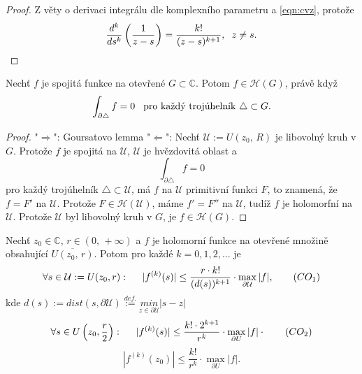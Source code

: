 \begin{proof}
Z věty o derivaci integrálu dle komplexního parametru a \cref{eqn:cvz}, protože 
\[\frac{d^k}{ds^k}\left(\frac{1}{z-s}\right)=
\frac{k!}{(z-s)^{k+1}},\hspace{2mm} z\neq{s}.\]
\end{proof}


\begin{theorem}[Morera]
Nechť $f$ je spojitá funkce na otevřené $G\subset{\mathbb{C}}$. Potom $f\in\mathcal{H}(G)$, právě když
\begin{equation}
    \begin{aligned}
\int_{\partial\triangle}{f} =0 \hspace{3mm} \text{pro každý trojúhelník }\triangle\subset{G}.    
    \end{aligned}
    \label{eqn:morera}
\end{equation}
\end{theorem}

\begin{proof}
"$\Rightarrow$": Goursatovo lemma\newline
"$\Leftarrow$": Nechť $\mathcal{U}:=U(z_0,\, R)$ je libovolný kruh v $G$. Protože $f$ je spojitá na $\mathcal{U}$, $\mathcal{U}$ je hvězdovitá oblast a 
\[\int_{\partial\triangle}{f} =0\]
pro každý trojúhelník $\triangle\subset\mathcal{U}$, má $f$ na $\mathcal{U}$ primitivní funkci $F$, to znamená, že $f=F'$ na $\mathcal{U}$. Protože $F\in\mathcal{H}(\mathcal{U})$, máme $f'=F''$ na $\mathcal{U}$, tudíž $f$ je holomorfní na $\mathcal{U}$. Protože $\mathcal{U}$ byl libovolný kruh v $G$, je $f\in\mathcal{H}(G)$.
\end{proof}


\begin{theorem}
Nechť $z_0\in\mathbb{C}$, $r\in(0,\, +\infty)$ a $f$ je holomorní funkce na otevřené množině obsahující $\overline{U(z_0,\, r)}$. Potom pro každé $k=0,1,2,...$ je 
\begin{equation}
\forall{s\in{\mathcal{U}:=U(z_0,r)}}:\hspace{5mm}|f^{(k)}(s)|\leq\frac{r\cdot k!}{(d(s))^{k+1}}\cdot \max_{\partial\mathcal{U}}{|f|},    
\tag{$CO_1$}
\label{eqn:co1}
\end{equation}
kde $d(s) := dist(s,\partial\mathcal{U})\overset{def.}{:=}\underset{{z\in{\partial{\mathcal{U}}}}}{min}{|s-z|}$
\begin{equation}
\forall{s\in{U\left(z_0,\frac{r}{2}\right)}}:\hspace{5mm}|f^{(k)}(s)|\leq\frac{k!\cdot2^{k+1}}{r^k}\cdot\max_{\partial{U}}{|f|}\cdot
\tag{$CO_2$}
\label{eqn:co2}
\end{equation}
\begin{equation}
    |f^{(k)}(z_0)|\leq\frac{k!}{r^k}\cdot\max_{\partial{U}}{|f|}. 
\tag{$CO_3$}
\label{eqn:co3}
\end{equation}
\end{theorem}

